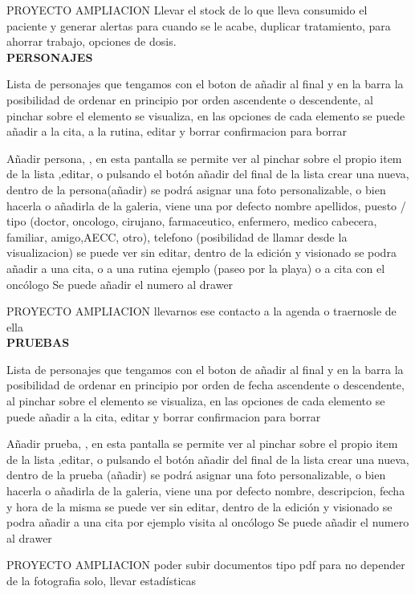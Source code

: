 \documentclass[../pfc.tex]{subfiles}
\begin{document}
	PROYECTO AMPLIACION Llevar el stock de lo que lleva consumido el paciente y generar alertas para cuando se le acabe, duplicar tratamiento, para ahorrar trabajo, opciones de dosis.\\
	
	
	\textbf{PERSONAJES}
	
	Lista de personajes que tengamos con el boton de añadir al final y en la barra la posibilidad de ordenar en principio por orden ascendente o descendente,
	al pinchar sobre el elemento se visualiza, 
	en las opciones de cada elemento se puede añadir a la cita, a la rutina, editar y borrar confirmacion para borrar
	
	Añadir persona, , en esta pantalla se permite ver al pinchar sobre el propio item de la lista ,editar, o pulsando el botón añadir del final de la lista crear una nueva, 
	dentro de la persona(añadir) se podrá asignar una foto personalizable, o bien hacerla o añadirla de la galeria, viene una por defecto
	nombre apellidos, puesto / tipo (doctor, oncologo, cirujano, farmaceutico, enfermero, medico cabecera, familiar, amigo,AECC, otro), telefono (posibilidad de llamar desde la visualizacion)
	se puede ver sin editar, dentro de la edición y visionado se podra añadir a una cita, o a una rutina ejemplo (paseo por la playa) o a cita con el oncólogo
	Se puede añadir el numero al drawer
	
	PROYECTO AMPLIACION llevarnos ese contacto a la agenda o traernosle de ella\\
	
	
	\textbf{PRUEBAS}
	
	Lista de personajes que tengamos con el boton de añadir al final y en la barra la posibilidad de ordenar en principio por orden de fecha ascendente o descendente,
	al pinchar sobre el elemento se visualiza, 
	en las opciones de cada elemento se puede añadir a la cita, editar y borrar confirmacion para borrar
	
	Añadir prueba, , en esta pantalla se permite ver al pinchar sobre el propio item de la lista ,editar, o pulsando el botón añadir del final de la lista crear una nueva, 
	dentro de la prueba (añadir) se podrá asignar una foto personalizable, o bien hacerla o añadirla de la galeria, viene una por defecto
	nombre, descripcion,
	fecha y hora de la misma
	se puede ver sin editar, dentro de la edición y visionado se podra añadir a una cita por ejemplo visita al oncólogo
	Se puede añadir el numero al drawer
	
	PROYECTO AMPLIACION poder subir documentos tipo pdf para no depender de la fotografia solo, llevar estadísticas\\
	
\end{document}
